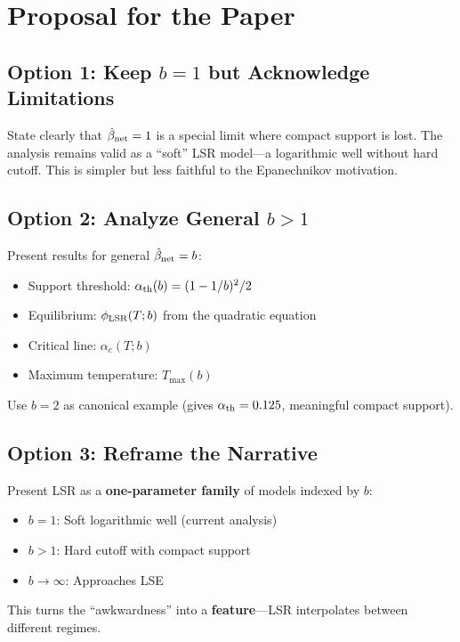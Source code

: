 \documentclass[11pt]{article}
\newcommand{\bhat}{\hat{\beta}_{\rm net}}
\begin{document}
\section{Proposal for the Paper}

\subsection{Option 1: Keep $b = 1$ but Acknowledge Limitations}

State clearly that $\bhat = 1$ is a special limit where compact support is lost. The analysis remains valid as a ``soft'' LSR model---a logarithmic well without hard cutoff. This is simpler but less faithful to the Epanechnikov motivation.

\subsection{Option 2: Analyze General $b > 1$}

Present results for general $\bhat = b$:
\begin{itemize}
    \item Support threshold: $\alpha_{\rm th}(b) = (1 - 1/b)^2/2$
    \item Equilibrium: $\phi_{\rm LSR}(T; b)$ from the quadratic equation
    \item Critical line: $\alpha_c(T; b)$
    \item Maximum temperature: $T_{\max}(b)$
\end{itemize}

Use $b = 2$ as canonical example (gives $\alpha_{\rm th} = 0.125$, meaningful compact support).

\subsection{Option 3: Reframe the Narrative}

Present LSR as a \textbf{one-parameter family} of models indexed by $b$:
\begin{itemize}
    \item $b = 1$: Soft logarithmic well (current analysis)
    \item $b > 1$: Hard cutoff with compact support
    \item $b \to \infty$: Approaches LSE
\end{itemize}

This turns the ``awkwardness'' into a \textbf{feature}---LSR interpolates between different regimes.
\end{document}
